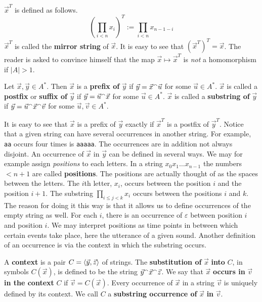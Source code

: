 $\vec{x}^T$ is defined as follows.
\begin{equation}
\left(\prod_{i < n} x_i\right)^T := \prod_{i < n} x_{n-1-i}
\end{equation}
$\vec{x}^T$ is called the \textbf{mirror string} of $\vec{x}$. It is
easy to see that $(\vec{x}^T)^T = \vec{x}$. The reader is asked to 
convince himself that the map $\vec{x} \mapsto \vec{x}^T$ is 
{\it not\/} a homomorphism if $|A| > 1$.
\begin{defn}
Let $\vec{x}, \vec{y} \in A^{\ast}$. Then $\vec{x}$ is a
\textbf{prefix of} $\vec{y}$ if $\vec{y} = \vec{x} {^{\smallfrown}}
\vec{u}$ for some $\vec{u} \in A^{\ast}$. $\vec{x}$ is called a
\textbf{postfix} or \textbf{suffix of} $\vec{y}$ if $\vec{y} = \vec{u}
{^{\smallfrown}} \vec{x}$ for some $\vec{u} \in A^{\ast}$.
$\vec{x}$ is called a \textbf{substring of} $\vec{y}$ if
$\vec{y} = \vec{u} {^{\smallfrown}} \vec{x} {^{\smallfrown}} \vec{v}$ for some
$\vec{u}, \vec{v} \in A^{\ast}$.
\end{defn}
It is easy to see that $\vec{x}$ is a prefix of $\vec{y}$
exactly if $\vec{x}^T$ is a postfix of $\vec{y}^T$.
Notice that a given string can have several occurrences
in another string. For example, {\tt aa} occurs four
times is {\tt aaaaa}. The occurrences are in addition
not always disjoint. An occurrence of $\vec{x}$ in
$\vec{y}$ can be defined in several ways. We may for
example assign {\it positions\/} to each letters.
In a string $x_0 x_1 \dotsc x_{n-1}$ the numbers $< n+1$
are called \textbf{positions}. The positions are actually thought
of as the spaces between the letters. The $i$th letter, $x_i$,
occurs between the position $i$ and the position $i+1$. The
substring $\prod_{i \leq j < k} x_i$ occurs between the positions
$i$ and $k$. The reason for doing it this way is that it allows
us to define occurrences of the empty string as well. For each
$i$, there is an occurrence of $\varepsilon$ between position
$i$ and position $i$. We may interpret positions as time points
in between which certain events take place, here the utterance
of a given sound. Another definition of an occurrence is via
the context in which the substring occurs.
\begin{defn}
A \textbf{context} is a pair $C = \langle \vec{y}, \vec{z}\rangle$ of 
strings. The  \textbf{substitution of} $\vec{x}$ \textbf{into} 
$C$, in symbols $C(\vec{x})$, is defined to be the string
$\vec{y} {^{\smallfrown}} \vec{x} {^{\smallfrown}} \vec{z}$. We say that
$\vec{x}$ \textbf{occurs in} $\vec{v}$ \textbf{in the
context} $C$ if $\vec{v} = C(\vec{x})$. Every occurrence
of $\vec{x}$ in a string $\vec{v}$ is uniquely defined by
its context. We call $C$ a \textbf{substring occurrence of}
$\vec{x}$ \textbf{in} $\vec{v}$.
\end{defn}
